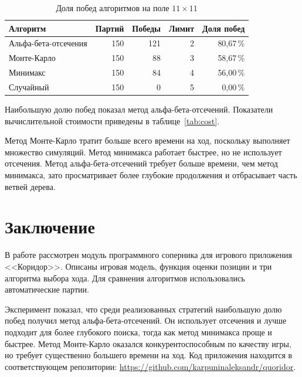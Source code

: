 \documentclass{csmathnotes}
\begin{document}
\begin{table}
\centering
\caption{Доля побед алгоритмов на поле $11\times11$}
\label{tab:summary}
\begin{tabular}{lrrrr}
\toprule
Алгоритм & Партий & Победы & Лимит & Доля побед \\
\midrule
Альфа-бета-отсечения & 150 & 121 & 2 & 80,67\,\% \\
Монте-Карло          & 150 & 88  & 3 & 58,67\,\% \\
Минимакс             & 150 & 84  & 4 & 56,00\,\% \\
Случайный  & 150 & 0   & 5 & 0,00\,\% \\
\bottomrule
\end{tabular}
\end{table}

Наибольшую долю побед показал метод альфа-бета-отсечений. Показатели вычислительной стоимости приведены в таблице~\ref{tab:cost}.

\begin{table}
\centering
\caption{Вычислительные показатели на поле $11\times11$}
\label{tab:cost}
\end{table}

Метод Монте-Карло тратит больше всего времени на ход, поскольку выполняет множество симуляций. Метод минимакса работает быстрее, но не использует отсечения. Метод альфа-бета-отсечений требует больше времени, чем метод минимакса, зато просматривает более глубокие продолжения и отбрасывает часть ветвей дерева.

\section*{Заключение}

В работе рассмотрен модуль программного соперника для игрового приложения <<Коридор>>. Описаны игровая модель, функция оценки позиции и три алгоритма выбора хода. Для сравнения алгоритмов использовались автоматические партии.

Эксперимент показал, что среди реализованных стратегий наибольшую долю побед получил метод альфа-бета-отсечений. Он использует отсечения и лучше подходит для более глубокого поиска, тогда как метод минимакса проще и быстрее. Метод Монте-Карло оказался конкурентоспособным по качеству игры, но требует существенно большего времени на ход. Код приложения находится в соответствующем репозитории: \url{https://github.com/karpuninaleksandr/quoridor}.

\printbibliography
\end{document}
